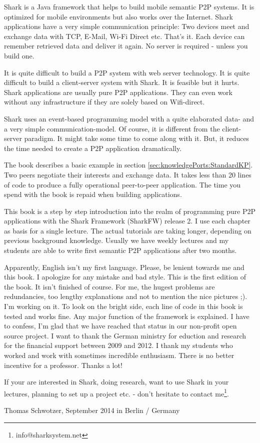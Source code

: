 Shark is a Java framework that helps to build mobile semantic P2P systems. It is optimized for mobile environments but also works over the Internet. Shark applications have a very simple communication principle: Two devices meet and exchange data with TCP, E-Mail, Wi-Fi Direct etc. That's it. Each device can remember retrieved data and deliver it again. No server is required - unless you build one. 

It is quite difficult to build a P2P system with web server technology. It is quite difficult to build a client-server system with Shark. It is feasible but it hurts. Shark applications are usually pure P2P applications. They can even work without any infrastructure if they are solely based on Wifi-direct.

Shark uses an event-based programming model with a quite elaborated data- and a very simple communication-model. Of course, it is different from the client-server paradigm. It might take some time to come along with it. But, it reduces the time needed to create a P2P application dramatically. 

The book describes a basic example in section \ref{sec:knowledgePorts:StandardKP}. Two peers negotiate their interests and exchange data. It takes less than 20 lines of code to produce a fully operational peer-to-peer application. The time you spend with the book is repaid when building applications.

This book is a step by step introduction into the realm of programming pure 
P2P applications with the Shark Framework (SharkFW) release 2. I use each 
chapter as basis for a single lecture. The actual tutorials are taking longer, depending on previous background knowledge. Usually we have weekly lectures and my students are able to write first semantic P2P applications after two months.

Apparently, English isn't my first language. Please, be lenient towards me and this book. I apologize for any mistake and bad style. This is the first edition of the book. It isn't finished of course. For me, the hugest problems are redundancies, too lengthy explanations and not to mention the nice pictures ;). I'm working on it. To look on the bright side, each line of code in this book is tested and works fine. Any major function of the framework is explained. I have to confess, I'm glad that we have reached that status in our non-profit open source project.
I want to thank the German ministry for eduction and research for the financial support between 2009 and 2012. I thank my students who worked and work with sometimes incredible enthusiasm. There is no better incentive for a professor. Thanks a lot!

If your are interested in Shark, doing research, want to use Shark in your lectures, planning to set up a project etc. - don't hesitate to contact me\footnote{info@sharksystem.net}.

\vspace{1,5cm}

Thomas Schwotzer, September 2014 in Berlin / Germany
